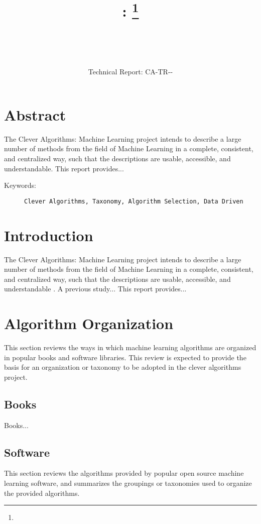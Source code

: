 \documentclass[a4paper, 11pt]{article}
\title{{\myreporttitle}: {\myreportsubtitle}\footnote{\myreportlicense}}
\author{\myreportauthor\\{\myreportemail}\\\small\myreportproject}
\date{\myreportfulldate\\{\small{Technical Report: CA-TR-{\myreportdate}-\myreportversion}}}
\begin{document}
\maketitle

\section*{Abstract} 
The Clever Algorithms: Machine Learning project intends to describe a large number of methods from the field of Machine Learning in a complete, consistent, and centralized way, such that the descriptions are usable, accessible, and understandable.
This report provides...


\begin{description}
	\item[Keywords:] {\small\texttt{Clever Algorithms, Taxonomy, Algorithm Selection, Data Driven}}
\end{description} 

%
%
\section{Introduction}
\label{sec:introduction}
The Clever Algorithms: Machine Learning project intends to describe a large number of methods from the field of Machine Learning in a complete, consistent, and centralized way, such that the descriptions are usable, accessible, and understandable \cite{Brownlee2011a}.
A previous study...
This report provides...


%
%
\section{Algorithm Organization}
\label{sec:organization}
This section reviews the ways in which machine learning algorithms are organized in popular books and software libraries. This review is expected to provide the basis for an organization or taxonomy to be adopted in the clever algorithms project.

\subsection{Books}
Books...


\subsection{Software}
This section reviews the algorithms provided by popular open source machine learning software, and summarizes the groupings or taxonomies used to organize the provided algorithms.
\end{document}
